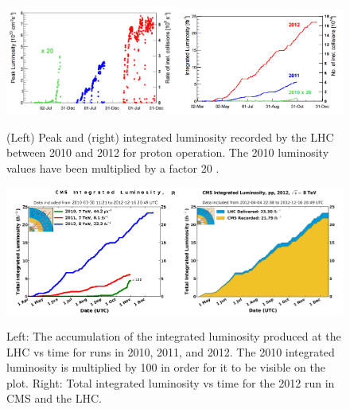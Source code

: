 \newpage

\begin{figure} \label{fig-LHClumi}
\includegraphics[width=0.5\textwidth]{Figures/LHClumi2.png}\includegraphics[width=0.5\textwidth]{Figures/LHClumi.png}
\caption{(Left) Peak and (right) integrated luminosity recorded by the LHC between 2010 and 2012 for proton operation. The 2010 luminosity values have been multiplied by a factor 20 \cite{LHClumi}.}
\end{figure}

\begin{figure} \label{fig-CMSlumi}
\includegraphics[width=0.5\textwidth]{Figures/IntLumi2.png}\includegraphics[width=0.5\textwidth]{Figures/CMSIntLumi.png}
\caption{Left: The accumulation of the integrated luminosity produced at the LHC vs time for runs in 2010, 2011, and 2012. The 2010 integrated luminosity is multiplied by 100 in order for it to be visible on the plot. Right: Total integrated luminosity vs time for the 2012 run in CMS and the LHC.}
\end{figure}

